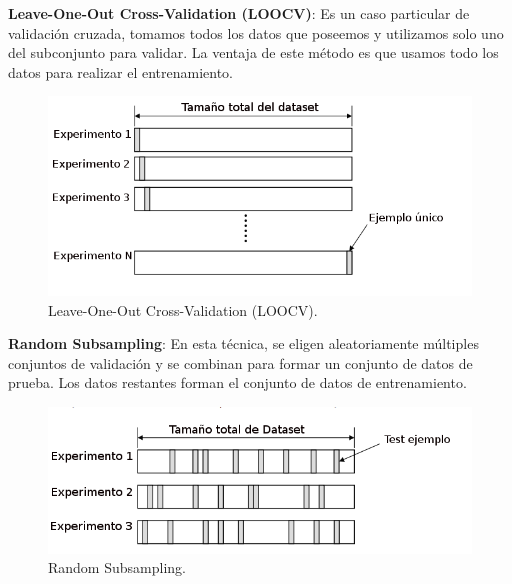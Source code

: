 \par \textbf{Leave-One-Out Cross-Validation (LOOCV)}: Es un caso particular de validación cruzada, tomamos todos los datos que poseemos y utilizamos solo uno del subconjunto para validar. La ventaja de este método es que usamos todo los datos para realizar el entrenamiento.

\begin{figure}[H]
 \centering
  \includegraphics[scale=0.4,keepaspectratio=true,clip=true]{imagenes/MarcoTeorico/cross-validation-LOOCV.png}
  \caption{Leave-One-Out Cross-Validation (LOOCV).}%
	\label{Fig: crossvalidation-LOOCV}
\end{figure}

\par \textbf{Random Subsampling}: En esta técnica, se eligen aleatoriamente múltiples conjuntos de validación y se combinan para formar un conjunto de datos de prueba. Los datos restantes forman el conjunto de datos de entrenamiento.

\begin{figure}[H]
 \centering
  \includegraphics[scale=0.5,keepaspectratio=true,clip=true]{imagenes/MarcoTeorico/cross-validation-random.png}
  \caption{Random Subsampling.}%
	\label{Fig: random-Subsampling}
\end{figure}


